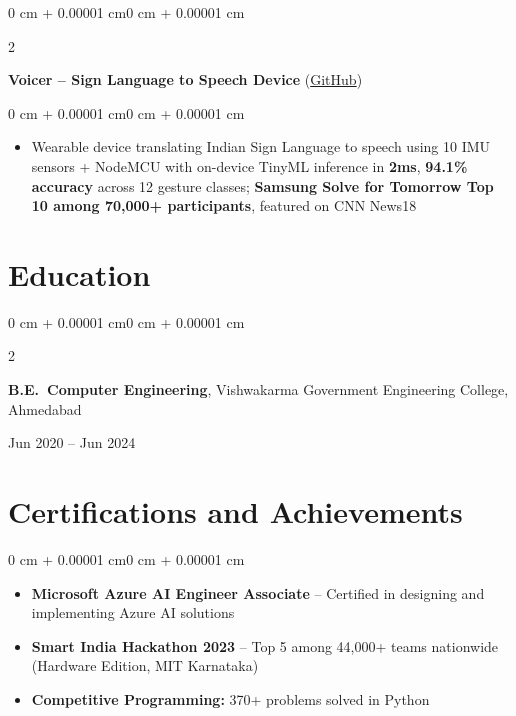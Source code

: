 \documentclass[10pt, letterpaper]{article}
\newenvironment{highlights}{
    \begin{itemize}[
        topsep=0.01 cm,
        parsep=0.01 cm,
        partopsep=0pt,
        itemsep=0pt,
        leftmargin=0 cm + 10pt
    ]
}{
    \end{itemize}
}
\newenvironment{highlightsforbulletentries}{
    \begin{itemize}[
        topsep=0.01 cm,
        parsep=0.01 cm,
        partopsep=0pt,
        itemsep=0pt,
        leftmargin=10pt
    ]
}{
    \end{itemize}
}
\newenvironment{onecolentry}{
    \begin{adjustwidth}{0 cm + 0.00001 cm}{0 cm + 0.00001 cm}
}{
    \end{adjustwidth}
}
\newenvironment{twocolentry}[2][]{
    \onecolentry
    \def\secondColumn{#2}
    \setcolumnwidth{\fill, 5.5 cm}
    \begin{paracol}{2}
}{
    \switchcolumn \raggedleft \secondColumn
    \end{paracol}
    \endonecolentry
}
\let\hrefWithoutArrow\href
\begin{document}
        \vspace{0.05 cm}

        \begin{twocolentry}{
            2023
        }
            \textbf{Voicer -- Sign Language to Speech Device} (\hrefWithoutArrow{https://github.com/amit-gohel/voicer}{GitHub})
        \end{twocolentry}

        \vspace{0.02 cm}
        \begin{onecolentry}
            \begin{highlights}
                \item Wearable device translating Indian Sign Language to speech using 10 IMU sensors + NodeMCU with on-device TinyML inference in \textbf{2ms}, \textbf{94.1\% accuracy} across 12 gesture classes; \textbf{Samsung Solve for Tomorrow Top 10 among 70,000+ participants}, featured on CNN News18
            \end{highlights}
        \end{onecolentry}

    \section{Education}

        \begin{twocolentry}{
            Jun 2020 -- Jun 2024
        }
            \textbf{B.E.\ Computer Engineering}, Vishwakarma Government Engineering College, Ahmedabad
        \end{twocolentry}

    \section{Certifications and Achievements}

    \begin{onecolentry}
        \begin{highlightsforbulletentries}
            \item \textbf{Microsoft Azure AI Engineer Associate} -- Certified in designing and implementing Azure AI solutions
            \item \textbf{Smart India Hackathon 2023} -- Top 5 among 44,000+ teams nationwide (Hardware Edition, MIT Karnataka)
            \item \textbf{Competitive Programming:} 370+ problems solved in Python
        \end{highlightsforbulletentries}
    \end{onecolentry}
\end{document}
